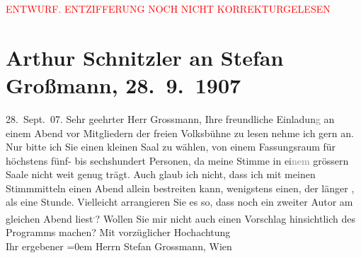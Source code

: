 
\begin{center}
            \textcolor{red}{ENTWURF. ENTZIFFERUNG NOCH NICHT KORREKTURGELESEN}
                      \end{center}
            
               \section[Arthur Schnitzler an Stefan Großmann, 28. 9. 1907]{ Arthur Schnitzler an Stefan Großmann, 28. 9. 1907}\nopagebreak{}\rehead{ }\begin{ledgroupsized}[t]{13cm}\normalsize\beginnumbering{} \toendnotes[C]{\smallbreak\pagebreak[2]} 
\toendnotes[C]{\smallbreak}\pstart
           \raggedleft{}{\pb}28. Sept. 07. \pend
           \pstart{}Sehr geehrter Herr Grossmann,\pend\pstart
           Ihre freundliche Einladun\textcolor{gray}{g} an einem Abend vor Mitgliedern der freien Volksbühne zu lesen nehme ich gern an. Nur
               bitte ich Sie einen kleinen Saal zu wählen, von einem Fassungsraum für höchstens
               fünf- bis sechshundert Personen, da meine Stimme in ei\textcolor{gray}{nem} grössern
               Saale nicht weit genug trägt. Auch glaub ich nicht, dass ich mit meinen Stimmmitteln
               einen Abend allein bestreiten kann, wenigstens einen, der länger \label{T_L01712_1v}\label{T_L01712_1h}, als eine Stunde. Vielleicht
               arrangieren Sie es so, dass noch ein zweiter Autor am gleichen Abend liest\substVorne{}\textsuperscript{.}\substDazwischen{}?\substHinten{} Wollen Sie mir nicht auch einen Vorschlag hinsichtlich des Programms
               machen?\pend
           \pstart
           Mit vorzüglicher Hochachtung{\\[\baselineskip]}Ihr ergebener\pend
           \leftskip=0em{}{\bigskip}\pstart
           \noindent{}Herrn Stefan Grossmann, Wien\pend
           \endnumbering{}\end{ledgroupsized}  \newcommand{\dateiname}{L01712}\newcommand{\titel}{Arthur Schnitzler an Stefan Großmann, 28. 9. 1907}\newcommand{\editorInnen}{Martin Anton Müller und Gerd-Hermann Susen}
      